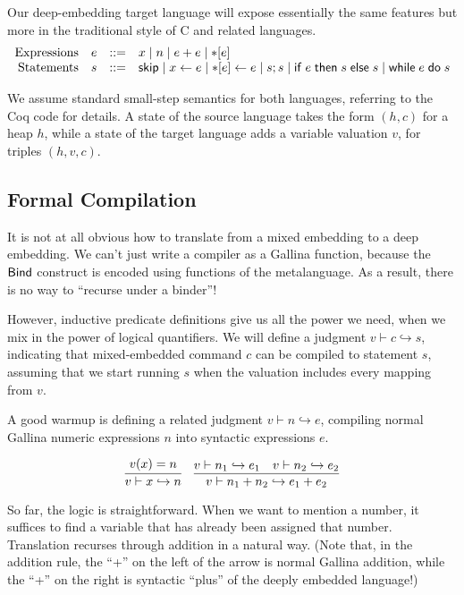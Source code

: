 \documentclass{amsbook}
\theoremstyle{definition}
\theoremstyle{remark}
\numberwithin{section}{chapter}
\numberwithin{equation}{chapter}
\begin{document}
Our deep-embedding target language will expose essentially the same features but more in the traditional style of C and related languages.
$$\begin{array}{rrcl}
  \textrm{Expressions} & e &::=& x \mid n \mid e + e \mid {*}[e] \\
  \textrm{Statements} &s &::=& \mathsf{skip} \mid x \leftarrow e \mid {*}[e] \leftarrow e \mid s; s \mid \mathsf{if} \; e \; \mathsf{then} \; s \; \mathsf{else} \; s \mid \mathsf{while} \; e \; \mathsf{do} \; s
\end{array}$$

We assume standard small-step semantics for both languages, referring to the Coq code for details.
A state of the source language takes the form $(h, c)$ for a heap $h$, while a state of the target language adds a variable valuation $v$, for triples $(h, v, c)$.

\subsection{Formal Compilation}

It is not at all obvious how to translate from a mixed embedding to a deep embedding.
We can't just write a compiler as a Gallina function, because the $\mathsf{Bind}$ construct is encoded using functions of the metalanguage.
As a result, there is no way to ``recurse under a binder''!

\newcommand{\dscomp}[3]{#1 \vdash #2 \hookrightarrow #3}

However, inductive predicate definitions give us all the power we need, when we mix in the power of logical quantifiers.
We will define a judgment $\dscomp{v}{c}{s}$, indicating that mixed-embedded command $c$ can be compiled to statement $s$, assuming that we start running $s$ when the valuation includes every mapping from $v$.

A good warmup is defining a related judgment $\dscomp{v}{n}{e}$, compiling normal Gallina numeric expressions $n$ into syntactic expressions $e$.

$$\infer{\dscomp{v}{x}{n}}{
  v(x) = n
}
\quad \infer{\dscomp{v}{n_1 + n_2}{e_1 + e_2}}{
  \dscomp{v}{n_1}{e_1}
  & \dscomp{v}{n_2}{e_2}
}$$

So far, the logic is straightforward.
When we want to mention a number, it suffices to find a variable that has already been assigned that number.
Translation recurses through addition in a natural way.
(Note that, in the addition rule, the ``+'' on the left of the arrow is normal Gallina addition, while the ``+'' on the right is syntactic ``plus'' of the deeply embedded language!)
\end{document}
